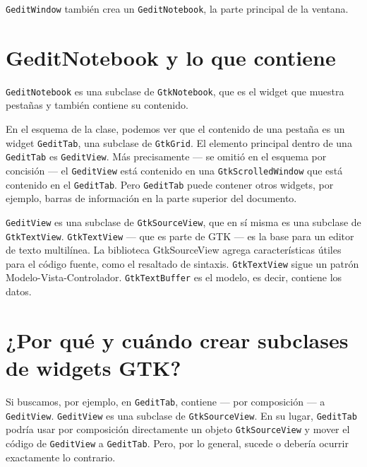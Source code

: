 \lstinline{GeditWindow} también crea un \lstinline{GeditNotebook}, la parte principal de la ventana.

\section{GeditNotebook y lo que contiene}

\lstinline{GeditNotebook} es una subclase de \lstinline{GtkNotebook}, que es el widget que muestra pestañas y también contiene su contenido.

En el esquema de la clase, podemos ver que el contenido de una pestaña es un widget \lstinline{GeditTab}, una subclase de \lstinline{GtkGrid}. El elemento principal dentro de una \lstinline{GeditTab} es \lstinline{GeditView}. Más precisamente --- se omitió en el esquema por concisión --- el \lstinline{GeditView} está contenido en una \lstinline{GtkScrolledWindow} que está contenido en el \lstinline{GeditTab}. Pero \lstinline{GeditTab} puede contener otros widgets, por ejemplo, barras de información en la parte superior del documento.

\lstinline{GeditView} es una subclase de \lstinline{GtkSourceView}, que en sí misma es una subclase de \lstinline{GtkTextView}. \lstinline{GtkTextView} --- que es parte de GTK --- es la base para un editor de texto multilínea. La biblioteca GtkSourceView agrega características útiles para el código fuente, como el resaltado de sintaxis. \lstinline{GtkTextView} sigue un patrón Modelo-Vista-Controlador. \lstinline{GtkTextBuffer} es el modelo, es decir, contiene los datos.

\section{¿Por qué y cuándo crear subclases de widgets GTK?}

Si buscamos, por ejemplo, en \lstinline{GeditTab}, contiene --- por composición --- a \lstinline{GeditView}. \lstinline{GeditView} es una subclase de \lstinline{GtkSourceView}. En su lugar, \lstinline{GeditTab} podría usar por composición directamente un objeto \lstinline{GtkSourceView} y mover el código de \lstinline{GeditView} a \lstinline{GeditTab}. Pero, por lo general, sucede o debería ocurrir exactamente lo contrario.

